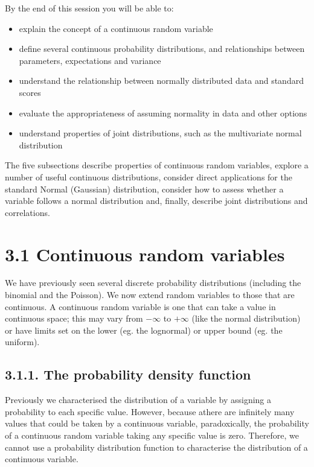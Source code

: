 \documentclass[letterpaper,10pt,english]{jupyterBook}
\begin{document}
\sphinxAtStartPar
By the end of this session you will be able to:
\begin{itemize}
\item {} 
\sphinxAtStartPar
explain the concept of a continuous random variable

\item {} 
\sphinxAtStartPar
define several continuous probability distributions, and relationships between parameters, expectations and variance

\item {} 
\sphinxAtStartPar
understand the relationship between normally distributed data and standard scores

\item {} 
\sphinxAtStartPar
evaluate the appropriateness of assuming normality in data and other options

\item {} 
\sphinxAtStartPar
understand properties of joint distributions, such as the multivariate normal distribution

\end{itemize}



\sphinxAtStartPar
The five sub\sphinxhyphen{}sections describe properties of continuous random variables, explore a number of useful continuous distributions, consider direct applications for the standard Normal (Gaussian) distribution, consider how to assess whether a variable follows a normal distribution and, finally, describe joint distributions and correlations.


\section{3.1 Continuous random variables}
\label{\detokenize{03.b. Continuous Probability Distributions:continuous-random-variables}}\label{\detokenize{03.b. Continuous Probability Distributions::doc}}
\sphinxAtStartPar
We have previously seen several discrete probability distributions (including the binomial and the Poisson). We now extend random variables to those that are continuous. A continuous random variable is one that can take a value in continuous space; this may vary from \(-\infty\) to \(+\infty\) (like the normal distribution) or have limits set on the lower (eg. the log\sphinxhyphen{}normal) or upper bound (eg. the uniform).


\subsection{3.1.1. The probability density function}
\label{\detokenize{03.b. Continuous Probability Distributions:the-probability-density-function}}
\sphinxAtStartPar
Previously we characterised the distribution of a variable by assigning a probability to each specific value. However, because athere are infinitely many values that could be taken by a continuous variable, paradoxically, the probability of a continuous random variable taking any specific value is zero. Therefore, we cannot use a probability distribution function to characterise the distribution of a continuous variable.
\end{document}
